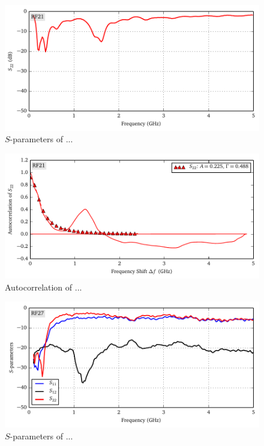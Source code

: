 \begin{figure}
 \centering
 \includegraphics{figs/active/RF21-sParameters.pdf}
 \caption{$S$-parameters of ...}
\end{figure}

\begin{figure}
 \centering
 \includegraphics{figs/active/RF21-autoCorrelation.pdf}
 \caption{Autocorrelation of ...}
\end{figure}

\begin{figure}
 \centering
 \includegraphics{figs/active/RF27-sParameters.pdf}
 \caption{$S$-parameters of ...}
\end{figure}

